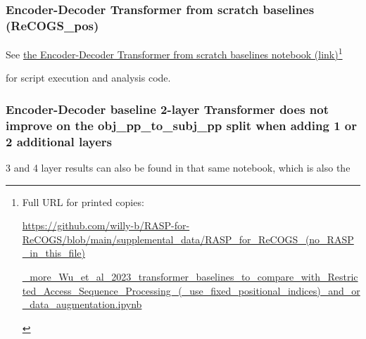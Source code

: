 \documentclass[11pt]{article}
\begin{document}
\subsubsection{\citep{Wu2023} Encoder-Decoder Transformer from scratch baselines (ReCOGS\_pos)}

See \href{https://github.com/willy-b/RASP-for-ReCOGS/blob/main/supplemental\_data/RASP\_for\_ReCOGS\_(no\_RASP\_in\_this\_file)\_more\_Wu\_et\_al\_2023\_transformer\_baselines\_to\_compare\_with\_Restricted\_Access\_Sequence\_Processing\_(\_use\_fixed\_positional\_indices)\_and\_or\_data\_augmentation.ipynb}{the Encoder-Decoder Transformer from scratch baselines notebook (link)}\footnote{\begin{tiny}Full URL for printed copies: 

\href{https://github.com/willy-b/RASP-for-ReCOGS/blob/main/supplemental\_data/RASP\_for\_ReCOGS\_(no\_RASP\_in\_this\_file)\_more\_Wu\_et\_al\_2023\_transformer\_baselines\_to\_compare\_with\_Restricted\_Access\_Sequence\_Processing\_(\_use\_fixed\_positional\_indices)\_and\_or\_data\_augmentation.ipynb}{https://github.com/willy-b/RASP-for-ReCOGS/blob/main/supplemental\_data/RASP\_for\_ReCOGS\_(no\_RASP\_in\_this\_file)}

\href{https://github.com/willy-b/RASP-for-ReCOGS/blob/main/supplemental\_data/RASP\_for\_ReCOGS\_(no\_RASP\_in\_this\_file)\_more\_Wu\_et\_al\_2023\_transformer\_baselines\_to\_compare\_with\_Restricted\_Access\_Sequence\_Processing\_(\_use\_fixed\_positional\_indices)\_and\_or\_data\_augmentation.ipynb}{\_more\_Wu\_et\_al\_2023\_transformer\_baselines\_to\_compare\_with\_Restricted\_Access\_Sequence\_Processing\_(\_use\_fixed\_positional\_indices)\_and\_or\_data\_augmentation.ipynb}\end{tiny}}

for \citep{Wu2023} script execution and analysis code.

\subsubsection{\citep{Wu2023} Encoder-Decoder baseline 2-layer Transformer does not improve on the obj\_pp\_to\_subj\_pp split when adding 1 or 2 additional layers}

3 and 4 layer results can also be found in that same notebook, which is also the
\end{document}
